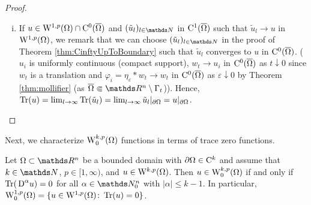 \begin{proof}
\begin{enumerate}[i)]
  \item If $u \in \mathrm{W}^{1,p}(\Omega) \cap \mathrm{C}^0(\overline\Omega)$ and $(\tilde u_l)_{l \in \N}$ in $\mathrm{C}^1(\overline\Omega)$ such that $\tilde u_l \to u$ in $\mathrm{W}^{1,p}(\Omega)$, we remark that we can choose $(\tilde u_l)_{l \in \N}$ in the proof of Theorem \ref{thm:CinftyUpToBoundary} such that $\tilde u_l$ converges to $u$ in $\mathrm{C}^0(\overline\Omega)$.
    ($u_i$ is uniformly continuous (compact support), $w_t \to u_i$ in $\mathrm{C}^0(\overline\Omega)$ as $t \downarrow 0$ since $w_t$ is a translation and $\varphi_i = \eta_\varepsilon \ast w_t \to w_t$ in $\mathrm{C}^0(\overline\Omega)$ as $\varepsilon \downarrow 0$  by Theorem \ref{thm:mollifier} (as $\overline\Omega \Subset \R^n \setminus \Gamma_t$)).
    Hence, $\operatorname{Tr} (u) = \lim_{l \to \infty} \operatorname{Tr} (\tilde u_l) = \lim_{l \to \infty} \tilde u_l|_{\partial\Omega} = u|_{\partial \Omega}$. \qedhere
\end{enumerate}
\end{proof}

Next, we characterize $\mathrm{W}_0^{k,p}(\Omega)$ functions in terms of trace zero functions.

\begin{thm}
  \label{thm:traceZeroFunctions}
  Let $\Omega \subset \R^n$ be a bounded domain with $\partial\Omega \in \mathrm{C}^k$ and assume that $k \in \N$, $p \in [ 1, \infty)$, and $u \in \mathrm{W}^{k,p}(\Omega)$.
    Then
    $
    u \in \mathrm{W}_0^{k,p}(\Omega)$ if and only if $\operatorname{Tr}(\,{\operatorname{D}}^\alpha u) = 0$ for all  $\alpha \in \N_0^n$ with $|\alpha| \leq k - 1$.
    In particular, $\mathrm{W}_0^{1,p}(\Omega) = \{ u \in \mathrm{W}^{1,p}(\Omega) \colon \operatorname{Tr}(u) = 0 \}$.
\end{thm}

